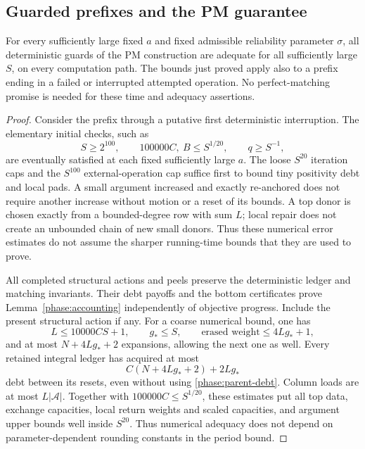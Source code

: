 \subsection{Guarded prefixes and the PM guarantee}

\begin{lemma}
\label{phase:guard-adequacy}
For every sufficiently large fixed \(a\) and fixed
admissible reliability parameter \(\sigma\), all deterministic
guards of the PM construction are adequate for all
sufficiently large \(S\), on every computation path.
The bounds just proved apply also to a prefix ending in a
failed or interrupted attempted operation.  No perfect-matching
promise is needed for these time and adequacy assertions.
\end{lemma}

\begin{proof}
Consider the prefix through a putative first deterministic
interruption.  The elementary initial checks, such as
\[
 S\ge2^{100},\qquad
 100000C,\ B\le S^{1/20},\qquad q\ge S^{-1},
\]
are eventually satisfied at each fixed sufficiently large
\(a\).  The loose \(S^{20}\) iteration caps and the
\(S^{100}\) external-operation cap suffice first to bound
tiny positivity debt and local pads.  A small argument
increased and exactly re-anchored does not require another
increase without motion or a reset of its bounds.  A top
donor is chosen exactly from a bounded-degree row with sum
\(L\); local repair does not create an unbounded chain of
new small donors.  Thus these numerical error estimates
do not assume the sharper running-time bounds that they
are used to prove.

All completed structural actions and peels preserve the
deterministic ledger and matching invariants.  Their debt
payoffs and the bottom certificates prove
Lemma~\ref{phase:accounting} independently of objective
progress.  Include the present structural action if any.
For a coarse numerical bound, one has
\[
 L\le10000CS+1,\qquad g_*\le S,\qquad
 \text{erased weight}\le4Lg_*+1,
\]
and at most \(N+4Lg_*+2\) expansions, allowing the next
one as well.  Every retained integral ledger has acquired
at most
\begin{equation}
\label{phase:crude-debt}
                      C(N+4Lg_*+2)+2Lg_*
\end{equation}
debt between its resets, even without using
\eqref{phase:parent-debt}.  Column loads are at most
\(L|\mathcal A|\).
Together with \(100000C\le S^{1/20}\), these estimates put
all top data, exchange capacities, local return weights
and scaled capacities, and argument upper bounds well
inside \(S^{20}\).
Thus numerical adequacy does not depend on
parameter-dependent rounding constants in the period bound.


\end{proof}
